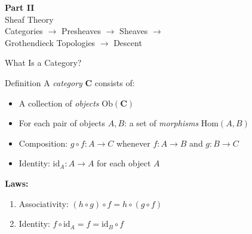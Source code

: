 \documentclass[aspectratio=169,10pt]{beamer}
\newcommand{\Hom}{\mathrm{Hom}}
\newcommand{\id}{\mathrm{id}}
\newcommand{\Ob}{\mathrm{Ob}}
\begin{document}

\begin{frame}[plain]
\begin{center}
\vspace{2cm}
{\Huge\textbf{Part II}}\\[0.3em]
{\Large Sheaf Theory}\\[1em]
{\normalsize Categories $\to$ Presheaves $\to$ Sheaves $\to$\\
 Grothendieck Topologies $\to$ Descent}
\end{center}
\end{frame}

\begin{frame}{What Is a Category?}
\begin{block}{Definition}
A \emph{category} $\mathbf{C}$ consists of:
\begin{itemize}
  \item A collection of \emph{objects} $\Ob(\mathbf{C})$
  \item For each pair of objects $A, B$: a set of \emph{morphisms} $\Hom(A, B)$
  \item Composition: $g \circ f : A \to C$ whenever $f : A \to B$ and $g : B \to C$
  \item Identity: $\id_A : A \to A$ for each object $A$
\end{itemize}
\end{block}

\textbf{Laws:}
\begin{enumerate}
  \item Associativity: $(h \circ g) \circ f = h \circ (g \circ f)$
  \item Identity: $f \circ \id_A = f = \id_B \circ f$
\end{enumerate}
\end{frame}
\end{document}
